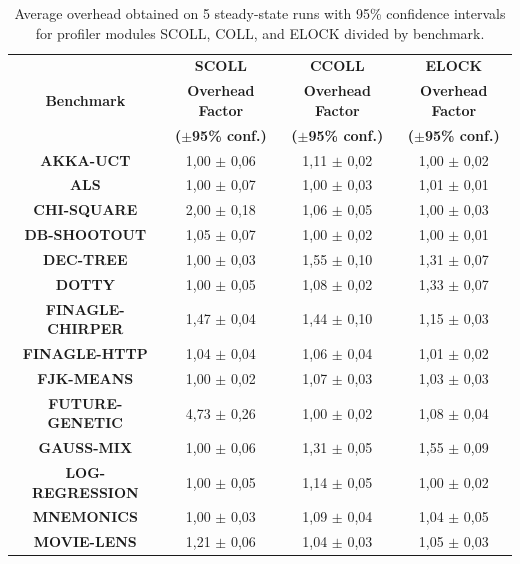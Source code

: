 \documentclass[]{usiinfthesis}
\begin{document}
\begin{table}
\centering
\caption[Overhead pt.1]{Average overhead obtained on 5 steady-state runs with 95\% confidence intervals for profiler modules SCOLL, COLL, and ELOCK divided by benchmark.}
\label{tab:10}
\begin{tabular}{|c|c|c|c|}
\hline
		 & 	\textbf{	SCOLL	}	 & 	\textbf{	CCOLL	}	 & 	\textbf{	ELOCK	}	\\
\textbf{	Benchmark	}& 	\textbf{	Overhead Factor	}	 & 	\textbf{	Overhead Factor	}	 & 	\textbf{	Overhead Factor	}	\\
&	\textbf{	 ($\pm$95\% conf.) 	}	 & 	\textbf{	 ($\pm$95\% conf.) 	}	 & 	\textbf{	 ($\pm$95\% conf.) 	}	\\

\hline
\textbf{	AKKA-UCT	}&	 1,00 	 $\pm$ 	 0,06 	 & 	 1,11 	 $\pm$ 	 0,02 	 & 	 1,00 	 $\pm$ 	 0,02 	\\
\textbf{	ALS	}&	 1,00 	 $\pm$ 	 0,07 	 & 	 1,00 	 $\pm$ 	 0,03 	 & 	 1,01 	 $\pm$ 	 0,01 	\\
\textbf{	CHI-SQUARE	}&	 2,00 	 $\pm$ 	 0,18 	 & 	 1,06 	 $\pm$ 	 0,05 	 & 	 1,00 	 $\pm$ 	 0,03 	\\
\textbf{	DB-SHOOTOUT	}&	 1,05 	 $\pm$ 	 0,07 	 & 	 1,00 	 $\pm$ 	 0,02 	 & 	 1,00 	 $\pm$ 	 0,01 	\\
\textbf{	DEC-TREE	}&	 1,00 	 $\pm$ 	 0,03 	 & 	 1,55 	 $\pm$ 	 0,10 	 & 	 1,31 	 $\pm$ 	 0,07 	\\
\textbf{	DOTTY	}&	 1,00 	 $\pm$ 	 0,05 	 & 	 1,08 	 $\pm$ 	 0,02 	 & 	 1,33 	 $\pm$ 	 0,07 	\\
\textbf{	FINAGLE-CHIRPER	}&	 1,47 	 $\pm$ 	 0,04 	 & 	 1,44 	 $\pm$ 	 0,10 	 & 	 1,15 	 $\pm$ 	 0,03 	\\
\textbf{	FINAGLE-HTTP	}&	 1,04 	 $\pm$ 	 0,04 	 & 	 1,06 	 $\pm$ 	 0,04 	 & 	 1,01 	 $\pm$ 	 0,02 	\\
\textbf{	FJK-MEANS	}&	 1,00 	 $\pm$ 	 0,02 	 & 	 1,07 	 $\pm$ 	 0,03 	 & 	 1,03 	 $\pm$ 	 0,03 	\\
\textbf{	FUTURE-GENETIC	}&	 4,73 	 $\pm$ 	 0,26 	 & 	 1,00 	 $\pm$ 	 0,02 	 & 	 1,08 	 $\pm$ 	 0,04 	\\
\textbf{	GAUSS-MIX	}&	 1,00 	 $\pm$ 	 0,06 	 & 	 1,31 	 $\pm$ 	 0,05 	 & 	 1,55 	 $\pm$ 	 0,09 	\\
\textbf{	LOG-REGRESSION	}&	 1,00 	 $\pm$ 	 0,05 	 & 	 1,14 	 $\pm$ 	 0,05 	 & 	 1,00 	 $\pm$ 	 0,02 	\\
\textbf{	MNEMONICS	}&	 1,00 	 $\pm$ 	 0,03 	 & 	 1,09 	 $\pm$ 	 0,04 	 & 	 1,04 	 $\pm$ 	 0,05 	\\
\textbf{	MOVIE-LENS	}&	 1,21 	 $\pm$ 	 0,06 	 & 	 1,04 	 $\pm$ 	 0,03 	 & 	 1,05 	 $\pm$ 	 0,03 	\\

\end{tabular}
\end{table}
\end{document}
